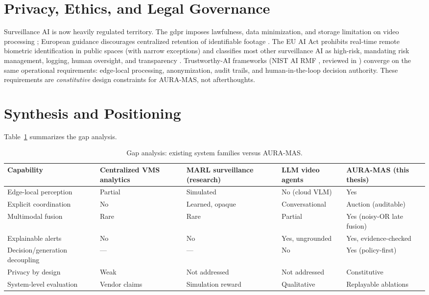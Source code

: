\section{Privacy, Ethics, and Legal Governance}

Surveillance AI is now heavily regulated territory. The \gls{gdpr} imposes lawfulness, data minimization, and storage limitation on video processing \cite{gdpr2016}; European guidance discourages centralized retention of identifiable footage \cite{cnil2025reduced, iapp2022smartcameras}. The EU AI Act \cite{euaiact2024} prohibits real-time remote biometric identification in public spaces (with narrow exceptions) and classifies most other surveillance AI as high-risk, mandating risk management, logging, human oversight, and transparency \cite{barkane2022questioning, barkane2025prohibited, edri2024biometric, lexology2025augmented}. Trustworthy-AI frameworks (NIST AI RMF \cite{livingsecurity2026nist}, reviewed in \cite{forasoft2026trustworthy, ruf2021demystifying}) converge on the same operational requirements: edge-local processing, anonymization, audit trails, and human-in-the-loop decision authority. These requirements are \emph{constitutive} design constraints for AURA-MAS, not afterthoughts.

\section{Synthesis and Positioning}

Table~\ref{tab:sota_gap} summarizes the gap analysis.

\begin{table}[H]
\centering
\caption{Gap analysis: existing system families versus AURA-MAS.}
\label{tab:sota_gap}
\small
\begin{tabular}{p{3.6cm}p{2.2cm}p{2.2cm}p{2.2cm}p{2.6cm}}
\toprule
\textbf{Capability} & \textbf{Centralized VMS analytics} & \textbf{MARL surveillance (research)} & \textbf{LLM video agents} & \textbf{AURA-MAS (this thesis)} \\
\midrule
Edge-local perception & Partial & Simulated & No (cloud VLM) & Yes \\
Explicit coordination & No & Learned, opaque & Conversational & Auction (auditable) \\
Multimodal fusion & Rare & Rare & Partial & Yes (noisy-OR late fusion) \\
Explainable alerts & No & No & Yes, ungrounded & Yes, evidence-checked \\
Decision/generation decoupling & --- & --- & No & Yes (policy-first) \\
Privacy by design & Weak & Not addressed & Not addressed & Constitutive \\
System-level evaluation & Vendor claims & Simulation reward & Qualitative & Replayable ablations \\
\bottomrule
\end{tabular}
\end{table}

